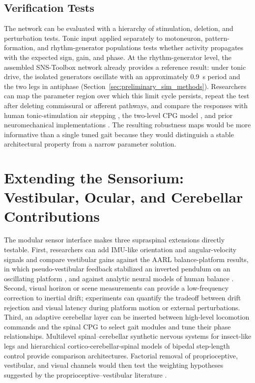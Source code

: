 \subsection{Verification Tests}

The network can be evaluated with a hierarchy of stimulation, deletion, and perturbation tests. Tonic input applied separately to motoneuron, pattern-formation, and rhythm-generator populations tests whether activity propagates with the expected sign, gain, and phase. At the rhythm-generator level, the assembled SNS-Toolbox network already provides a reference result: under tonic drive, the isolated generators oscillate with an approximately \qty{0.9}{\second} period and the two legs in antiphase (Section~\ref{sec:preliminary_sim_methods}). Researchers can map the parameter region over which this limit cycle persists, repeat the test after deleting commissural or afferent pathways, and compare the responses with human tonic-stimulation air stepping \citep{selionov_tonic_2009}, the two-level CPG model \citep{rybak_modelling_2006}, and prior neuromechanical implementations \citep{markin_afferent_2010, shevtsova_modeling_2016}. The resulting robustness maps would be more informative than a single tuned gait because they would distinguish a stable architectural property from a narrow parameter solution.

\section{Extending the Sensorium: Vestibular, Ocular, and Cerebellar Contributions}\label{sec:fw_senses}

The modular sensor interface makes three supraspinal extensions directly testable. First, researchers can add IMU-like orientation and angular-velocity signals and compare vestibular gains against the AARL balance-platform results, in which pseudo-vestibular feedback stabilized an inverted pendulum on an oscillating platform \citep{bolen_balance_2024, bolen_selfbalancing_2024, bolen_selfbalancing_srs_2024}, and against analytic neural models of human balance \citep{hilts_dynamic_2019}. Second, visual horizon or scene measurements can provide a low-frequency correction to inertial drift; experiments can quantify the tradeoff between drift rejection and visual latency during platform motion or external perturbations. Third, an adaptive cerebellar layer can be inserted between high-level locomotion commands and the spinal CPG to select gait modules and tune their phase relationships. Multilevel spinal--cerebellar synthetic nervous systems for insect-like legs \citep{grummer_multilevel_2024} and hierarchical cortico-cerebellar-spinal models of bipedal step-length control \citep{chen_corticocerebellar_2025} provide comparison architectures. Factorial removal of proprioceptive, vestibular, and visual channels would then test the weighting hypotheses suggested by the proprioceptive--vestibular literature \citep{akay_relative_2021}.

